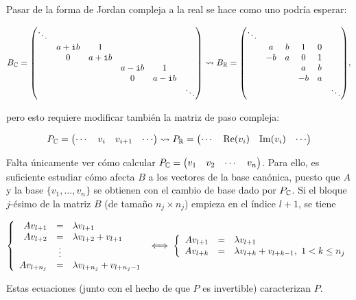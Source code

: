 \documentclass[../ecuaciones_diferenciales.tex]{subfiles}
\begin{document}
Pasar de la forma de Jordan compleja a la real se hace como uno podría
esperar:

\[B_\Complex =
	\mat{\ddots &      &      &      &      &         \\
		& a + \iu b & 1    &      &      &         \\
		& 0    & a + \iu b &      &      &         \\
		&      &      & a - \iu b & 1    &         \\
		&      &      & 0    & a - \iu b &         \\
		&      &      &      &      & \ddots} \leadsto
	B_\R =
	\mat{\ddots &    &   &    &      &         \\
		& a  & b & 1  & 0 &         \\
		& -b & a & 0  & 1 &         \\
		&    &   & a  & b &         \\
		&    &   & -b & a &         \\
		&    &   &    &   & \ddots},
\]

pero esto requiere modificar también la matriz de paso compleja:

\[P_{\mathbb{C}} =
	\begin{pmatrix}\cdots & v_i & v_{i+1} & \cdots\end{pmatrix} \leadsto
	P_{\mathbb{R}} =
	\begin{pmatrix}\cdots & \mathrm{Re}(v_i) & \mathrm{Im}(v_i) & \cdots\end{pmatrix}\]

Falta únicamente ver cómo calcular
\(P_{\mathbb{C}} = \begin{pmatrix}v_1 & v_2 & \cdots & v_n\end{pmatrix}\). Para ello, es suficiente
estudiar cómo afecta \(B\) a los vectores de la base canónica, puesto que
\(A\) y la base \(\{v_1, \dots, v_n\}\) se obtienen con el cambio de
base dado por \(P_{\mathbb{C}}\). Si el bloque \(j\)-ésimo de la matriz \(B\) (de
tamaño \(n_j \times n_j\)) empieza en el índice \(l+1\), se tiene

\[\left\{
	\begin{array}[ht]{r c l}
		Av_{l+1}    & =      & \lambda v_{l+1}                 \\
		Av_{l+2}    & =      & \lambda v_{l+2} + v_{l+1}       \\
		            & \vdots &                                 \\
		A v_{l+n_j} & =      & \lambda v_{l+n_j} + v_{l+n_j-1}
	\end{array} \right. \iff
	\left\{
	\begin{array}[ht]{r c l}
		Av_{l+1} & = & \lambda v_{l+1}                               \\
		Av_{l+k} & = & \lambda v_{l+k} + v_{l+k-1}, \ 1 < k \leq n_j \\
	\end{array}
	\right.\]

Estas ecuaciones (junto con el hecho de que \(P\) es invertible)
caracterizan \(P\).
\end{document}
